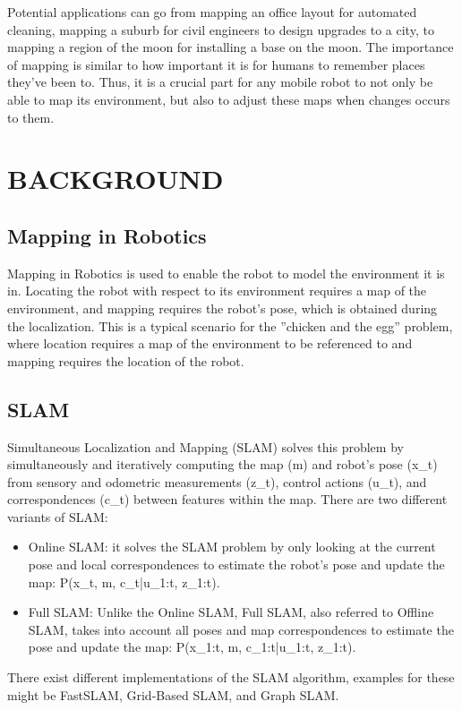 \documentclass[10pt,journal,compsoc]{IEEEtran}
\begin{document}
Potential applications can go from mapping an office
layout for automated cleaning, mapping a suburb for civil
engineers to design upgrades to a city, to mapping a region
of the moon for installing a base on the moon. The importance of mapping is similar to how important it is for humans
to remember places they’ve been to. Thus, it is a crucial part for any mobile robot to not only be able to map its environment, but also to adjust these maps when changes occurs to them.



\section{BACKGROUND}
\subsection{Mapping in Robotics}
Mapping in Robotics is used to enable the robot to model the environment it is in. Locating the robot with respect
to its environment requires a map of the environment, and
mapping requires the robot’s pose, which is obtained during
the localization. This is a typical scenario for the ”chicken and the egg”
problem, where location requires a map of the environment to be referenced to
and mapping requires the location of the robot.
\subsection{SLAM}
Simultaneous Localization and Mapping (SLAM) solves this
problem by simultaneously and iteratively computing the
map (m) and robot’s pose (x\_t) from sensory and odometric measurements (z\_t), control actions (u\_t), and correspondences (c\_t) between features within the map. There are two
different variants of SLAM:
\begin{itemize}
\item Online SLAM: it solves the SLAM problem by only
looking at the current pose and local correspondences to estimate the robot’s pose and update the
map: P(x\_t, m, c\_t|u\_{1:t}, z\_{1:t}).
\item Full SLAM: Unlike the Online SLAM, Full SLAM,
also referred to Offline SLAM, takes into account all
poses and map correspondences to estimate the pose
and update the map: P(x\_{1:t}, m, c\_{1:t}|u\_{1:t}, z\_{1:t}).
\end {itemize}
There exist different implementations of the SLAM algorithm, examples for these might be FastSLAM, Grid-Based
SLAM, and Graph SLAM.
\end{document}
